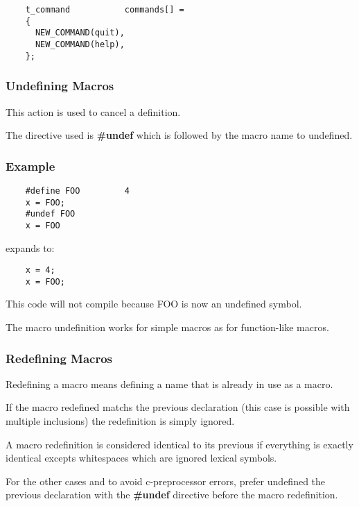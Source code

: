 {\begin{frame}[containsverbatim]
\begin{verbatim}
    t_command           commands[] =
    {
      NEW_COMMAND(quit),
      NEW_COMMAND(help),
    };
  \end{verbatim}
\end{frame}


\begin{frame}
  \frametitle{Undefining Macros}

  This action is used to cancel a definition.

  \nl

  The directive used is \textbf{\#undef} which is followed by the macro
  name to undefined.
\end{frame}


\begin{frame}[containsverbatim]
  \frametitle{Example}

  \begin{verbatim}
    #define FOO         4
    x = FOO;
    #undef FOO
    x = FOO
  \end{verbatim}

  expands to:

  \begin{verbatim}
    x = 4;
    x = FOO;
  \end{verbatim}

  This code will not compile because FOO is now an undefined symbol.

  \nl

  The macro undefinition works for simple macros as for function-like macros.
\end{frame}


\begin{frame}
  \frametitle{Redefining Macros}

  Redefining a macro means defining a name that is already in use as a macro.

  \nl

  If the macro redefined matchs the previous declaration (this case is possible
  with multiple inclusions) the redefinition is simply ignored.

  \nl

  A macro redefinition is considered identical to its previous if everything is
  exactly identical excepts whitespaces which are ignored lexical symbols.

  \nl

  For the other cases and to avoid c-preprocessor errors, prefer
  undefined the previous declaration with the \textbf{\#undef} directive
  before the macro redefinition.
\end{frame}

}
